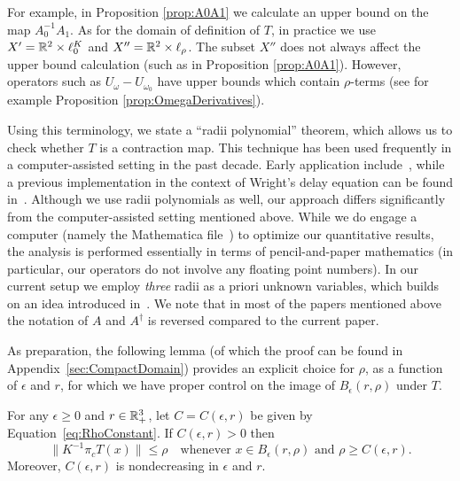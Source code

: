 For example, in Proposition \ref{prop:A0A1} we calculate an upper  bound on the map $A_0^{-1} A_1$.  
As for the domain of definition of $T$, in practice we use $X' = \mathbb{R}^2 \times  \ell^K_0  $ and  $X'' = \mathbb{R}^2 \times  \ell_\rho  $.
The subset $X''$ does not always affect the upper bound calculation (such as in Proposition \ref{prop:A0A1}). 
However, operators such as $U_{\omega} - U_{\omega_0}$ have upper bounds which contain $\rho$-terms (see for example Proposition \ref{prop:OmegaDerivatives}).

Using this terminology, we state a ``radii polynomial'' theorem, which allows us to check whether $T$ is a contraction map. This technique has been used frequently in a computer-assisted setting in the past decade. Early application include~\cite{daylessardmischaikow,lessardvandenberg}, while a previous implementation in the context of Wright's delay equation can be found in~\cite{lessard2010recent}. 
Although we use radii polynomials as well, our approach differs significantly from the computer-assisted setting mentioned above. 
While we do engage a computer (namely the Mathematica file~\cite{mathematicafile}) to optimize our quantitative results, the analysis is performed essentially in terms of pencil-and-paper mathematics (in particular, our operators do not involve any floating point numbers).
In our current setup we employ \emph{three} radii as a priori unknown variables,
which builds on an idea introduced in~\cite{vandenberg}.
We note that in most of the papers mentioned above the notation of $A$ and $A^\dagger$ is reversed compared to the current paper.

As preparation, the following lemma (of which the proof can be found in Appendix~\ref{sec:CompactDomain})  provides an explicit choice for $\rho$, as a function of $\epsilon$ and $r$, for which we have proper control on the image of $B_\epsilon(r,\rho)$ under $T$.
\begin{lemma}\label{lem:Crho}
For any $\epsilon \geq 0$ and $r \in\mathbb{R}^3_+$, let $C=C(\epsilon,r)$ be given  by Equation~\eqref{eq:RhoConstant}. 
If $C(\epsilon,r) >0$  then 
\begin{equation}\label{e:Cepsr} 
  \| K^{-1} \pi_c  T(x) \| \leq \rho 
  \quad\text{whenever } x \in B_\epsilon(r,\rho) \text{ and } \rho \geq C(\epsilon,r).
\end{equation}
Moreover, $C(\epsilon,r)$ is nondecreasing in $\epsilon$ and $r$. 
\end{lemma}

